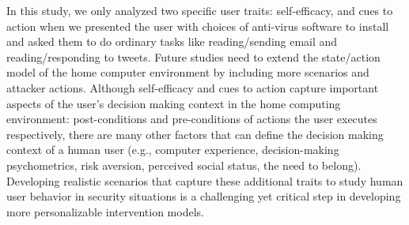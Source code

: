 In this study, we only analyzed two specific user traits: self-efficacy, and cues to action when we presented the user with choices of anti-virus software to install and asked them to do ordinary tasks like reading/sending email and reading/responding to tweets.
Future studies need to extend the state/action model of the home computer environment by including more scenarios and attacker actions.
Although self-efficacy and cues to action capture important aspects of the user's decision making context in the home computing environment: post-conditions and pre-conditions of actions the user executes respectively, there are many other factors that can define the decision making context of a human user (e.g., computer experience, decision-making psychometrics, risk aversion, perceived social status, the need
to belong). Developing realistic scenarios that capture these additional traits to study human user behavior in security situations is a challenging yet critical step in developing more personalizable intervention models.



